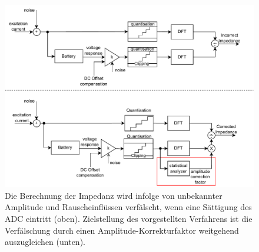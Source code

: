 \begin{figure}[tbh!] 
	\centering 
	\includegraphics[width=1\textwidth]{../img/system.pdf}
	\caption{Die Berechnung der Impedanz wird infolge von unbekannter Amplitude und Rauscheinflüssen verfälscht, wenn eine Sättigung des ADC eintritt (oben). Zielstellung des vorgestellten Verfahrens ist die Verfälschung durch einen Amplitude-Korrekturfaktor weitgehend auszugleichen (unten).}
	\label{fig:system}
\end{figure}
